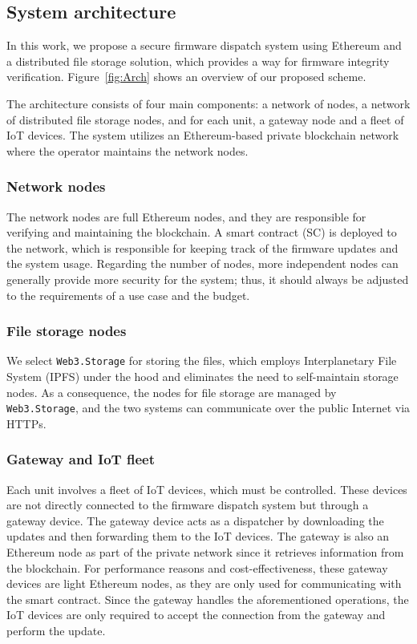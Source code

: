 \documentclass[conference]{IEEEtran}
\begin{document}
\subsection{System architecture}

In this work, we propose a secure firmware dispatch system using Ethereum and a distributed file storage solution, which provides a way for firmware integrity verification. Figure~\ref{fig:Arch} shows an overview of our proposed scheme.

The architecture consists of four main components: a network of nodes, a network of distributed file storage nodes, and for each unit, a gateway node and a fleet of IoT devices. The system utilizes an Ethereum-based private blockchain network where the operator maintains the network nodes.


\subsubsection{Network nodes}

The network nodes are full Ethereum nodes, and they are responsible for verifying and maintaining the blockchain. A smart contract (SC) is deployed to the network, which is responsible for keeping track of the firmware updates and the system usage. Regarding the number of nodes, more independent nodes can generally provide more security for the system; thus, it should always be adjusted to the requirements of a use case and the budget.

\subsubsection{File storage nodes}

We select \texttt{Web3.Storage} for storing the files, which employs Interplanetary File System (IPFS) under the hood and eliminates the need to self-maintain storage nodes. As a consequence, the nodes for file storage are managed by \texttt{Web3.Storage}, and the two systems can communicate over the public Internet via HTTPs.

\subsubsection{Gateway and IoT fleet}

Each unit involves a fleet of IoT devices, which must be controlled. These devices are not directly connected to the firmware dispatch system but through a gateway device. The gateway device acts as a dispatcher by downloading the updates and then forwarding them to the IoT devices. The gateway is also an Ethereum node as part of the private network since it retrieves information from the blockchain. For performance reasons and cost-effectiveness, these gateway devices are light Ethereum nodes, as they are only used for communicating with the smart contract. Since the gateway handles the aforementioned operations, the IoT devices are only required to accept the connection from the gateway and perform the update.
\end{document}
